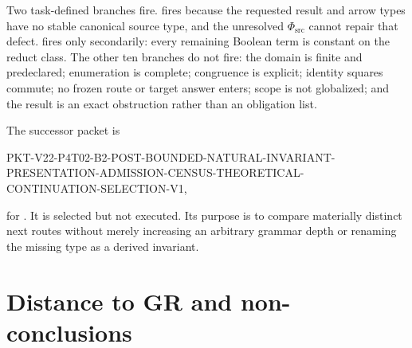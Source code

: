 \documentclass[11pt]{article}
\begin{document}
Two task-defined branches fire.   fires because the requested
result and arrow types have no stable canonical source type, and the unresolved
\(\Phi_{\mathrm{src}}\) cannot repair that defect.   fires only
secondarily: every remaining Boolean term is constant on the reduct class.
The other ten branches do not fire: the domain is finite and predeclared;
enumeration is complete; congruence is explicit; identity squares commute; no
frozen route or target answer enters; scope is not globalized; and the result
is an exact obstruction rather than an obligation list.

The successor packet is
\begin{flushleft}
\small\ttfamily
PKT-V22-P4T02-B2-POST-BOUNDED-NATURAL-INVARIANT-\\
PRESENTATION-ADMISSION-CENSUS-THEORETICAL-\\
CONTINUATION-SELECTION-V1,
\end{flushleft}
for .  It is selected but not
executed.  Its purpose is to compare materially distinct next routes without
merely increasing an arbitrary grammar depth or renaming the missing type as a
derived invariant.

\section{Distance to GR and non-conclusions}
\end{document}
